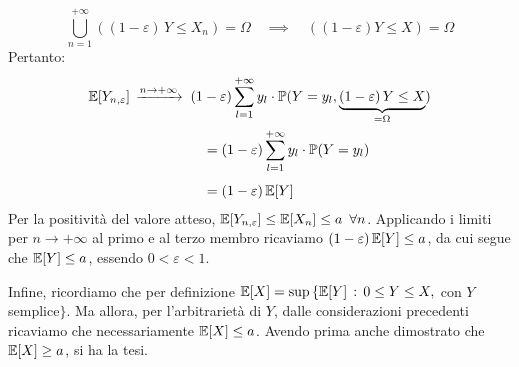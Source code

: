 \begin{dimo}
  $$
    \bigcup\limits_{n = 1}^{+\infty}
    \left((1 - \varepsilon) \, Y \le X_n \right)
    = \Omega \quad \implies \quad ((1-\varepsilon) Y \le X) = \Omega
  $$
Pertanto:
  \begin{align*}
    \mathbb E[Y_{n, \varepsilon}] \, \xrightarrow{n\to +\infty} \; (1 &- \varepsilon) \sum\limits_{l=1}^{+\infty} y_l \cdot
    \mathbb P(Y=y_l, \underbrace{(1-\varepsilon) \, Y \le X}_{= \Omega})\\
    &= (1 - \varepsilon) \sum\limits_{l=1}^{+\infty} y_l \cdot
    \mathbb P(Y=y_l)\\[4pt]
    &= (1 - \varepsilon) \, \mathbb E[Y]
  \end{align*}
  Per la positività del valore atteso, $\mathbb E[Y_{n, \varepsilon}] \le \mathbb E[X_n] \le a \enspace \forall n$.
  Applicando i limiti per $n \to +\infty$ al primo e al terzo membro ricaviamo $(1 - \varepsilon)\,\mathbb E[Y] \le a$, da cui segue che $\mathbb E[Y] \le a$, essendo $0 < \varepsilon < 1$.

  Infine, ricordiamo che per definizione
  $\mathbb E[X] = \sup\, \{ \mathbb E[Y] \, : \, 0 \le Y \le X,$ con $Y$ semplice$\}$.
  Ma allora, per l'arbitrarietà di $Y$, dalle considerazioni precedenti ricaviamo
  che necessariamente $\mathbb E[X] \le a$. Avendo prima anche dimostrato che $\mathbb E[X] \ge a$, si ha la tesi.
\end{dimo}
\medskip

